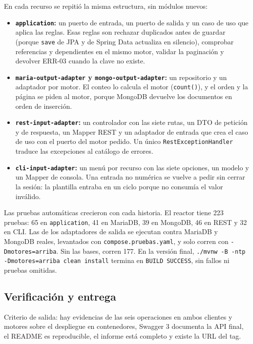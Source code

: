 \documentclass[11pt,a4paper]{article}
\begin{document}
En cada recurso se repitió la misma estructura, sin módulos nuevos:
\begin{itemize}
\item \textbf{\texttt{application}:} un puerto de entrada, un puerto de salida y
un caso de uso que aplica las reglas. Esas reglas son rechazar duplicados antes
de guardar (porque \texttt{save} de JPA y de Spring Data actualiza en silencio),
comprobar referencias y dependientes en el mismo motor, validar la paginación y
devolver ERR-03 cuando la clave no existe.
\item \textbf{\texttt{maria-output-adapter} y \texttt{mongo-output-adapter}:} un
repositorio y un adaptador por motor. El conteo lo calcula el motor
(\texttt{count()}), y el orden y la página se piden al motor, porque MongoDB
devuelve los documentos en orden de inserción.
\item \textbf{\texttt{rest-input-adapter}:} un controlador con las siete rutas,
un DTO de petición y de respuesta, un Mapper REST y un adaptador de entrada que
crea el caso de uso con el puerto del motor pedido. Un único
\texttt{RestExceptionHandler} traduce las excepciones al catálogo de errores.
\item \textbf{\texttt{cli-input-adapter}:} un menú por recurso con las siete
opciones, un modelo y un Mapper de consola. Una entrada no numérica se vuelve a
pedir sin cerrar la sesión: la plantilla entraba en un ciclo porque no consumía
el valor inválido.
\end{itemize}

Las pruebas automáticas crecieron con cada historia. El reactor tiene 223 pruebas:
65 en \texttt{application}, 41 en MariaDB, 39 en MongoDB, 46 en REST y 32 en CLI.
Las de los adaptadores de salida se ejecutan contra MariaDB y MongoDB reales,
levantados con \texttt{compose.pruebas.yaml}, y solo corren con
\texttt{-Dmotores=arriba}. Sin las bases, corren 177. En la versión final,
\texttt{./mvnw -B -ntp -Dmotores=arriba clean install} termina en \texttt{BUILD
SUCCESS}, sin fallos ni pruebas omitidas.

\subsection{Verificación y entrega}
Criterio de salida: hay evidencias de las seis operaciones en ambos clientes y
motores sobre el despliegue en contenedores, Swagger 3 documenta la API final, el
README es reproducible, el informe está completo y existe la URL del tag.
\end{document}
